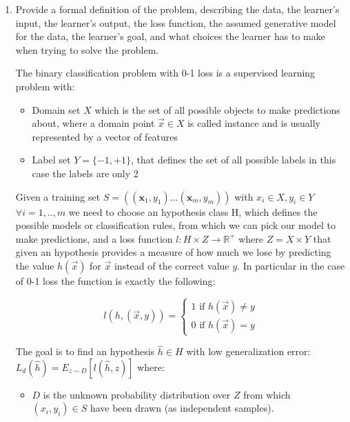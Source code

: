 \documentclass[a4paper,11pt,oneside]{book}
\begin{document}
\begin{enumerate}
\item Provide a formal definition of the problem, describing the data, the learner's input, the learner's output, the loss function, the assumed generative model for the data, the learner's goal, and what choices the learner has to make when trying to solve the problem.

\begin{solution}
    The binary classification problem with 0-1 loss is a supervised learning problem with:
    
    \begin{itemize}
    \item Domain set $X$ which is the set of all possible objects to make predictions about, where a domain point $\vec{x} \in X$ is called instance and is usually represented by a vector of features
    
    \item Label set $Y = \{-1, +1\}$, that defines the set of all possible labels in this case the labels are only 2
    \end{itemize}
    
    Given a training set $S = ((\mathbf{x}_1, y_1) ... (\mathbf{x}_m, y_m))$ with $x_i \in X, y_i \in Y$ $\forall i = 1,..,m$ we need to choose an hypothesis class H, which defines the possible models or classification rules, from which we can pick our model to make predictions, and a loss function $l: H \times Z \to \mathbb{R}^+$ where $Z = X \times Y$ that given an hypothesis provides a measure of how much we lose by predicting the value $h(\vec{x})$ for $\vec{x}$ instead of the correct value $y$. In particular in the case of 0-1 loss the function is exactly the following:
    
    $$l(h, (\vec{x},y)) = \begin{cases} 
    1 \text{ if } h(\vec{x}) \neq y \\
    0 \text{ if } h(\vec{x}) = y
    \end{cases}$$
    
    The goal is to find an hypothesis $\hat{h} \in H$ with low generalization error: $L_d(\hat{h}) = E_{z\sim D}[l(\hat{h},z)]$ where:
    
    \begin{itemize}
    \item $D$ is the unknown probability distribution over $Z$ from which $(x_i, y_i) \in S$ have been drawn (as independent samples).
    \end{itemize}
    \end{solution}


\end{enumerate}
\end{document}
